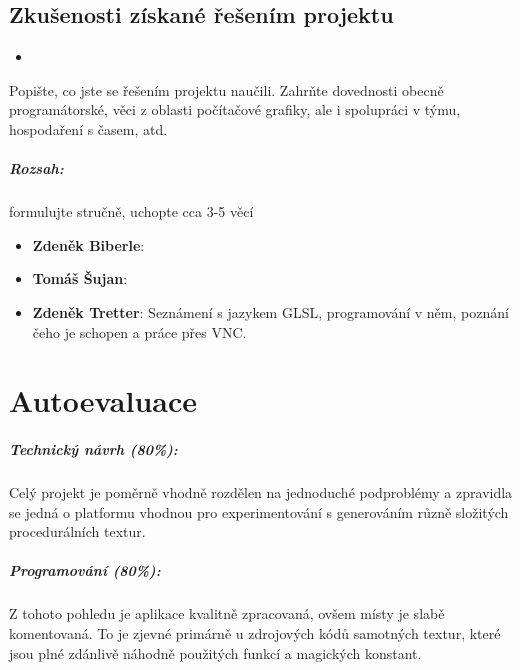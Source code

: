 \documentclass[12pt,a4paper,titlepage,final]{report}
\newcommand\AuthorA{Zdeněk Biberle}
\newcommand\AuthorB{Tomáš Šujan}
\newcommand\AuthorC{Zdeněk Tretter}
\begin{document}
\section{Zkušenosti získané řešením projektu}

\begin{itemize}
	\item 
\end{itemize}

Popište, co jste se řešením projektu naučili. Zahrňte dovednosti obecně
programátorské, věci z oblasti počítačové grafiky, ale i spolupráci v týmu,
hospodaření s časem, atd.

\paragraph{Rozsah:} formulujte stručně, uchopte cca 3-5 věcí

\begin{itemize}
\item \textbf{\AuthorA}:
\item \textbf{\AuthorB}:
\item \textbf{\AuthorC}: Seznámení s jazykem GLSL, programování v něm, poznání čeho je schopen a práce přes VNC.
\end{itemize}

\chapter{Autoevaluace}

\paragraph{Technický návrh (80\%):} Celý projekt je poměrně vhodně rozdělen na jednoduché podproblémy a zpravidla se jedná o platformu vhodnou pro experimentování s generováním různě složitých procedurálních textur.

\paragraph{Programování (80\%):} Z tohoto pohledu je aplikace kvalitně zpracovaná, ovšem místy je slabě komentovaná. To je zjevné primárně u zdrojových kódů samotných textur, které jsou plné zdánlivě náhodně použitých funkcí a magických konstant.
\end{document}
